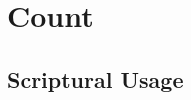 \section{Count}
	\label{COUNT}
	




	


\subsection{Scriptural Usage} %
	\label{COUNT-SCRIPTURES}

